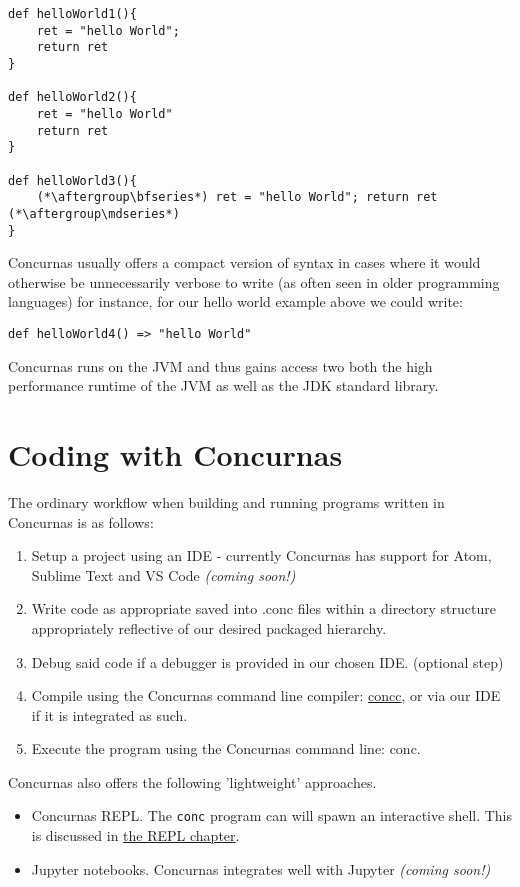 \documentclass[conc-doc]{subfiles}
\begin{document}
\begin{lstlisting}
def helloWorld1(){
	ret = "hello World";
	return ret
}

def helloWorld2(){
	ret = "hello World"
	return ret
}

def helloWorld3(){	
	(*\aftergroup\bfseries*) ret = "hello World"; return ret (*\aftergroup\mdseries*)
}
\end{lstlisting}

Concurnas usually offers a compact version of syntax in cases where it would otherwise be unnecessarily verbose to write (as often seen in older programming languages) for instance, for our hello world example above we could write:

\begin{lstlisting}
def helloWorld4() => "hello World"
\end{lstlisting}

Concurnas runs on the JVM and thus gains access two both the high performance runtime of the JVM as well as the JDK standard library.

\section{Coding with Concurnas}

The ordinary workflow when building and running programs written in Concurnas is as follows:

\begin{enumerate}
	\item Setup a project using an IDE - currently Concurnas has support for Atom, Sublime Text and VS Code  \textit{(coming soon!)}
	\item Write code as appropriate saved into .conc files within a directory structure appropriately reflective of our desired packaged hierarchy.
	\item Debug said code if a debugger is provided in our chosen IDE. (optional step)
	\item Compile using the Concurnas command line compiler: \hyperref[ch:concc]{concc}, or via our IDE if it is integrated as such.
	\item Execute the program using the Concurnas command line: conc.
\end{enumerate}

Concurnas also offers the following 'lightweight' approaches.

\begin{itemize}
	\item Concurnas REPL. The \lstinline{conc} program can will spawn an interactive shell. This is discussed in \hyperref[ch:repl]{the REPL chapter}.
	\item Jupyter notebooks. Concurnas integrates well with Jupyter\textit{ (coming soon!)}
\end{itemize}
\end{document}
